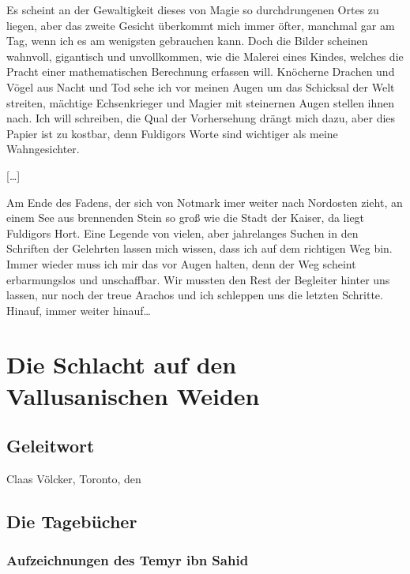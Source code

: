 Es scheint an der Gewaltigkeit dieses von Magie so durchdrungenen Ortes zu liegen, aber das zweite Gesicht überkommt mich immer öfter, manchmal gar am Tag, wenn ich es am wenigsten gebrauchen kann. Doch die Bilder scheinen wahnvoll, gigantisch und unvollkommen, wie die Malerei eines Kindes, welches die Pracht einer mathematischen Berechnung erfassen will. Knöcherne Drachen und Vögel aus Nacht und Tod sehe ich vor meinen Augen um das Schicksal der Welt streiten, mächtige Echsenkrieger und Magier mit steinernen Augen stellen ihnen nach. Ich will schreiben, die Qual der Vorhersehung drängt mich dazu, aber dies Papier ist zu kostbar, denn Fuldigors Worte sind wichtiger als meine Wahngesichter.

[\dots]

Am Ende des Fadens, der sich von Notmark imer weiter nach Nordosten zieht, an einem See aus brennenden Stein so groß wie die Stadt der Kaiser, da liegt Fuldigors Hort. Eine Legende von vielen, aber jahrelanges Suchen in den Schriften der Gelehrten lassen mich wissen, dass ich auf dem richtigen Weg bin. Immer wieder muss ich mir das vor Augen halten, denn der Weg scheint erbarmungslos und unschaffbar. Wir mussten den Rest der Begleiter hinter uns lassen, nur noch der treue Arachos und ich schleppen uns die letzten Schritte. Hinauf, immer weiter hinauf\dots


\chapter{Die Schlacht auf den Vallusanischen Weiden}

\section{Geleitwort}

\begin{flushright}
Claas Völcker, Toronto, den 
\end{flushright}

\section{Die Tagebücher}

\subsection{Aufzeichnungen des Temyr ibn Sahid}

